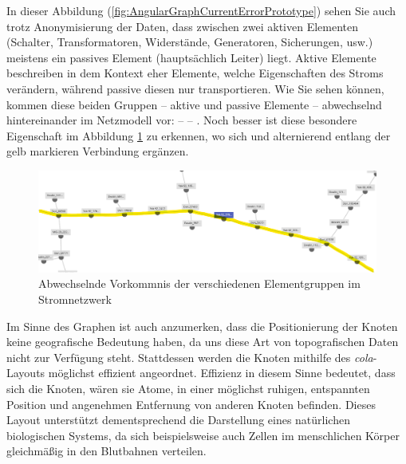 In dieser Abbildung (\ref{fig:AngularGraphCurrentErrorPrototype}) sehen Sie auch trotz Anonymisierung der Daten, dass zwischen zwei aktiven Elementen (Schalter, Transformatoren, Widerstände, Generatoren, Sicherungen, usw.) meistens ein passives Element (hauptsächlich Leiter) liegt. Aktive Elemente beschreiben in dem Kontext eher Elemente, welche Eigenschaften des Stroms verändern, während passive diesen nur transportieren. Wie Sie sehen können, kommen diese beiden Gruppen -- aktive und passive Elemente -- abwechselnd hintereinander im Netzmodell vor:  --  -- . Noch besser ist diese besondere Eigenschaft im Abbildung \ref{fig:AngularGraphAlternatingElementsPrototype} zu erkennen, wo sich  und  alternierend entlang der gelb markieren Verbindung ergänzen.

\setcapindent{90pt}
\begin{figure}
    \centering
    \includegraphics[width=1\textwidth]{content/img/Empire/Frontend/Angular_Graph_Alternating_Elements_Prototype.png}
    \caption{Abwechselnde Vorkommnis der verschiedenen Elementgruppen im Stromnetzwerk}
    \label{fig:AngularGraphAlternatingElementsPrototype}
\end{figure}
\FloatBarrier

Im Sinne des Graphen ist auch anzumerken, dass die Positionierung der Knoten keine geografische Bedeutung haben, da uns diese Art von topografischen Daten nicht zur Verfügung steht. Stattdessen werden die Knoten mithilfe des \emph{cola}-Layouts möglichst effizient angeordnet. Effizienz in diesem Sinne bedeutet, dass sich die Knoten, wären sie Atome, in einer möglichst ruhigen, entspannten Position und angenehmen Entfernung von anderen Knoten befinden. Dieses Layout unterstützt dementsprechend die Darstellung eines natürlichen biologischen Systems, da sich beispielsweise auch Zellen im menschlichen Körper gleichmäßig in den Blutbahnen verteilen. 